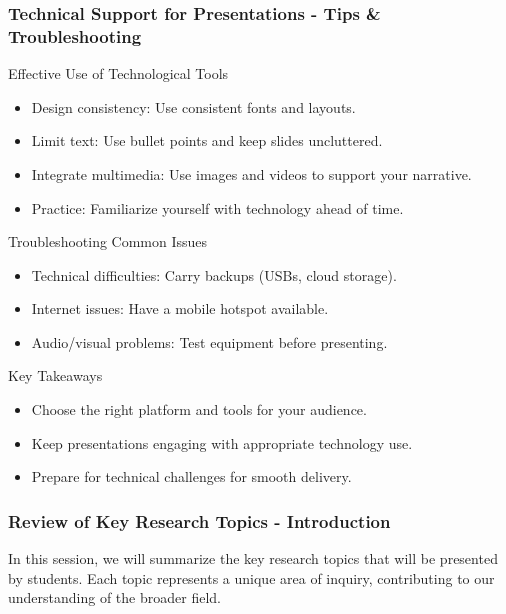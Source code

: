 \documentclass[aspectratio=169]{beamer}
\begin{document}
\begin{frame}[fragile]
    \frametitle{Technical Support for Presentations - Tips & Troubleshooting}
    \begin{block}{Effective Use of Technological Tools}
        \begin{itemize}
            \item Design consistency: Use consistent fonts and layouts.
            \item Limit text: Use bullet points and keep slides uncluttered.
            \item Integrate multimedia: Use images and videos to support your narrative.
            \item Practice: Familiarize yourself with technology ahead of time.
        \end{itemize}
    \end{block}
    
    \begin{block}{Troubleshooting Common Issues}
        \begin{itemize}
            \item Technical difficulties: Carry backups (USBs, cloud storage).
            \item Internet issues: Have a mobile hotspot available.
            \item Audio/visual problems: Test equipment before presenting.
        \end{itemize}
    \end{block}

    \begin{block}{Key Takeaways}
        \begin{itemize}
            \item Choose the right platform and tools for your audience.
            \item Keep presentations engaging with appropriate technology use.
            \item Prepare for technical challenges for smooth delivery.
        \end{itemize}
    \end{block}
\end{frame}

\begin{frame}[fragile]
    \frametitle{Review of Key Research Topics - Introduction}
    In this session, we will summarize the key research topics that will be presented by students. Each topic represents a unique area of inquiry, contributing to our understanding of the broader field.
\end{frame}
\end{document}
